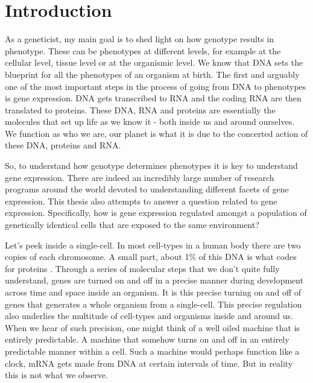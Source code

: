 \chapter{Introduction}
\label{chap:introduction}
\tightlists

As a geneticist, my main goal is to shed light on how genotype results in phenotype. These can be phenotypes at different levels, for example at the cellular level, tissue level or at the organismic level. We know that DNA sets the blueprint for all the phenotypes of an organism at birth. The first and arguably one of the most important steps in the process of going from DNA to phenotypes is gene expression. DNA gets transcribed to RNA and the coding RNA are then translated to proteins. These DNA, RNA and proteins are essentially the molecules that set up life as we know it - both inside us and around ourselves. We function as who we are, our planet is what it is due to the concerted action of these DNA, proteins and RNA.

So, to understand how genotype determines phenotypes it is key to understand gene expression. There are indeed an incredibly large number of research programs around the world devoted to understanding different facets of gene expression. This thesis also attempts to answer a question related to gene expression. Specifically, how is gene expression regulated amongst a population of genetically identical cells that are exposed to the same environment?

Let's peek inside a single-cell. In most cell-types in a human body there are two copies of each chromosome. A small part, about 1\% of this DNA is what codes for proteins \cite {lander2001n}. Through a series of molecular steps that we don't quite fully understand, genes are turned on and off in a precise manner during development across time and space inside an organism. It is this precise turning on and off of genes that generates a whole organism from a single-cell. This precise regulation also underlies the multitude of cell-types and organisms inside and around us. When we hear of such precision, one might think of a well oiled machine that is entirely predictable. A machine that somehow turns on and off in an entirely predictable manner within a cell. Such a machine would perhaps function like a clock, mRNA gets made from DNA at certain intervals of time. But in reality this is not what we observe.

